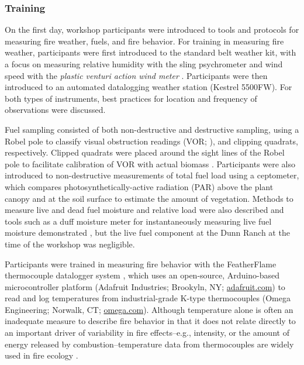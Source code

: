 \documentclass[fire,article,submit,moreauthors,pdftex]{Definitions/mdpi}
\begin{document}
\hypertarget{training-1}{%
\subsubsection{Training}\label{training-1}}

On the first day, workshop participants were introduced to tools and protocols for measuring fire weather, fuels, and fire behavior.
For training in measuring fire weather, participants were first introduced to the standard belt weather kit, with a focus on measuring relative humidity with the sling psychrometer and wind speed with the \emph{plastic venturi action wind meter} \citep{BeltWxKit}.
Participants were then introduced to an automated datalogging weather station (Kestrel 5500FW).
For both types of instruments, best practices for location and frequency of observations were discussed.

Fuel sampling consisted of both non-destructive and destructive sampling, using a Robel pole to classify visual obstruction readings (VOR; \citep{robel1970}), and clipping quadrats, respectively.
Clipped quadrats were placed around the sight lines of the Robel pole to facilitate calibration of VOR with actual biomass \citep{vermeire2002}.
Participants were also introduced to non-destructive measurements of total fuel load using a ceptometer, which compares photosynthetically-active radiation (PAR) above the plant canopy and at the soil surface to estimate the amount of vegetation.
Methods to measure live and dead fuel moisture and relative load were also described and tools such as a duff moisture meter for instantaneously measuring live fuel moisture demonstrated \citep{mcgranahan2019}, but the live fuel component at the Dunn Ranch at the time of the workshop was negligible.

Participants were trained in measuring fire behavior with the FeatherFlame thermocouple datalogger system \citep{mcgranahan2021b}, which uses an open-source, Arduino-based microcontroller platform (Adafruit Industries; Brookyln, NY; \href{https://adafruit.com}{adafruit.com}) to read and log temperatures from industrial-grade K-type thermocouples (Omega Engineering; Norwalk, CT; \href{https://omega.com}{omega.com}).
Although temperature alone is often an inadequate measure to describe fire behavior in that it does not relate directly to an important driver of variability in fire effects--e.g., intensity, or the amount of energy released by combustion--temperature data from thermocouples are widely used in fire ecology \citep{mcgranahan2020}.
\end{document}
